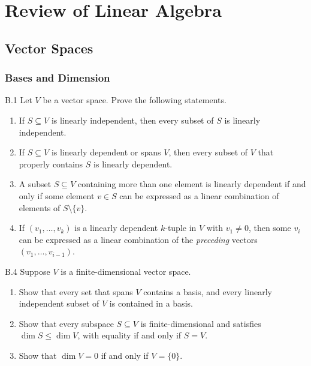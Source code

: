 \chapter{Review of Linear Algebra}

\section{Vector Spaces}

\subsection{Bases and Dimension}

\begin{exercise}{B.1}
    Let \( V \) be a vector space. Prove the following statements.
    \begin{enumerate}[label={(\alph*)}]
        \item If \( S \subseteq V \) is linearly independent, then every subset of \( S \) is linearly independent.
        \item If \( S \subseteq V \) is linearly dependent or spans \( V \), then every subset of \( V \) that properly contains \( S \) is linearly dependent.
        \item A subset \( S \subseteq V \) containing more than one element is linearly dependent if and only if some element \( v \in S \) can be expressed as a linear combination of elements of \( S \setminus \{v\} \).
        \item If \( (v_{1}, \dots, v_{k}) \) is a linearly dependent \( k \)-tuple in \( V \) with \( v_{1} \neq 0 \), then some \( v_{i} \) can be expressed as a linear combination of the \emph{preceding} vectors \( (v_{1}, \dots, v_{i-1}) \).
    \end{enumerate}
\end{exercise}

\begin{exercise}{B.4}
    Suppose \( V \) is a finite-dimensional vector space.
    \begin{enumerate}[label={(\alph*)}]
        \item Show that every set that spans \( V \) contains a basis, and every linearly independent subset of \( V \) is contained in a basis.
        \item Show that every subspace \( S \subseteq V \) is finite-dimensional and satisfies \( \dim S \le \dim V \), with equality if and only if \( S = V \).
        \item Show that \( \dim V = 0 \) if and only if \( V = \{0\} \).
    \end{enumerate}
\end{exercise}

